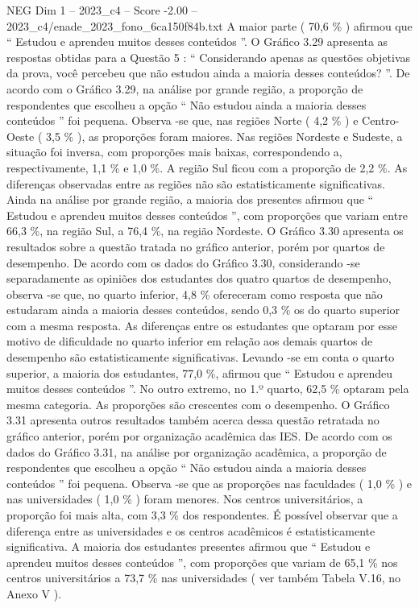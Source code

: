 \begin{textsample}{NEG Dim 1 – 2023\_c4 – Score -2.00 – 2023\_c4/enade\_2023\_fono\_6ca150f84b.txt}
A maior parte ( 70,6 \% ) afirmou que “ Estudou e aprendeu muitos desses conteúdos ”.
O Gráfico 3.29 apresenta as respostas obtidas para a Questão 5 : “ Considerando apenas as questões objetivas da prova, você percebeu que não estudou ainda a maioria desses conteúdos? ”.
De acordo com o Gráfico 3.29, na análise por grande região, a proporção de respondentes que escolheu a opção “ Não estudou ainda a maioria desses conteúdos ” foi pequena.
Observa -se que, nas regiões Norte ( 4,2 \% ) e Centro-Oeste ( 3,5 \% ), as proporções foram maiores.
Nas regiões Nordeste e Sudeste, a situação foi inversa, com proporções mais baixas, correspondendo a, respectivamente, 1,1 \% e 1,0 \%.
A região Sul ficou com a proporção de 2,2 \%.
As diferenças observadas entre as regiões não são estatisticamente significativas.
Ainda na análise por grande região, a maioria dos presentes afirmou que “ Estudou e aprendeu muitos desses conteúdos ”, com proporções que variam entre 66,3 \%, na região Sul, a 76,4 \%, na região Nordeste.
O Gráfico 3.30 apresenta os resultados sobre a questão tratada no gráfico anterior, porém por quartos de desempenho.
De acordo com os dados do Gráfico 3.30, considerando -se separadamente as opiniões dos estudantes dos quatro quartos de desempenho, observa -se que, no quarto inferior, 4,8 \% ofereceram como resposta que não estudaram ainda a maioria desses conteúdos, sendo 0,3 \% os do quarto superior com a mesma resposta.
As diferenças entre os estudantes que optaram por esse motivo de dificuldade no quarto inferior em relação aos demais quartos de desempenho são estatisticamente significativas.
Levando -se em conta o quarto superior, a maioria dos estudantes, 77,0 \%, afirmou que “ Estudou e aprendeu muitos desses conteúdos ”.
No outro extremo, no 1.º quarto, 62,5 \% optaram pela mesma categoria.
As proporções são crescentes com o desempenho.
O Gráfico 3.31 apresenta outros resultados também acerca dessa questão retratada no gráfico anterior, porém por organização acadêmica das IES.
De acordo com os dados do Gráfico 3.31, na análise por organização acadêmica, a proporção de respondentes que escolheu a opção “ Não estudou ainda a maioria desses conteúdos ” foi pequena.
Observa -se que as proporções nas faculdades ( 1,0 \% ) e nas universidades ( 1,0 \% ) foram menores.
Nos centros universitários, a proporção foi mais alta, com 3,3 \% dos respondentes.
É possível observar que a diferença entre as universidades e os centros acadêmicos é estatisticamente significativa.
A maioria dos estudantes presentes afirmou que “ Estudou e aprendeu muitos desses conteúdos ”, com proporções que variam de 65,1 \% nos centros universitários a 73,7 \% nas universidades ( ver também Tabela V.16, no Anexo V ).

\end{textsample}
